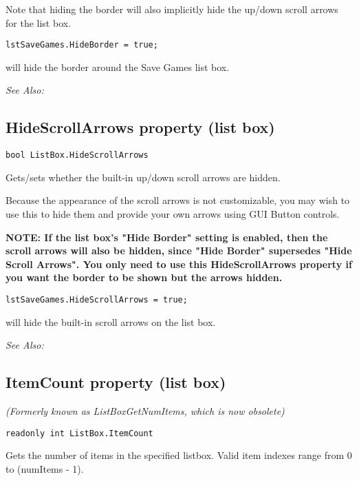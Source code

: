 Note that hiding the border will also implicitly hide the up/down scroll arrows for the list box.

\begin{verbatim}
lstSaveGames.HideBorder = true;
\end{verbatim}
will hide the border around the Save Games list box.

\it{See Also:} 


\subsection{HideScrollArrows property (list box)}\label{ListBox.HideScrollArrows}%

\begin{verbatim}
bool ListBox.HideScrollArrows
\end{verbatim}
Gets/sets whether the built-in up/down scroll arrows are hidden.

Because the appearance of the scroll arrows is not customizable, you may wish to use
this to hide them and provide your own arrows using GUI Button controls.

\bf{NOTE:} If the list box's "Hide Border" setting is enabled, then the scroll arrows will
also be hidden, since "Hide Border" supersedes "Hide Scroll Arrows". You only need to
use this HideScrollArrows property if you want the border to be shown but the arrows hidden.

\begin{verbatim}
lstSaveGames.HideScrollArrows = true;
\end{verbatim}
will hide the built-in scroll arrows on the list box.

\it{See Also:} 


\subsection{ItemCount property (list box)}\label{ListBox.ItemCount}%

\it{(Formerly known as ListBoxGetNumItems, which is now obsolete)}

\begin{verbatim}
readonly int ListBox.ItemCount
\end{verbatim}
Gets the number of items in the specified listbox. Valid item indexes
range from 0 to (numItems - 1).

